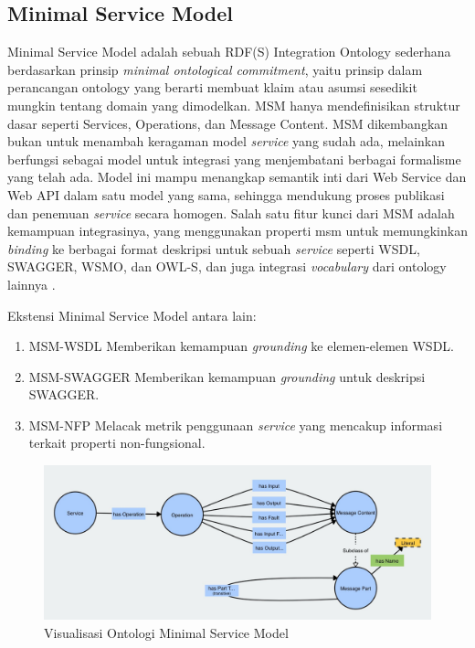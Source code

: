 \subsection{Minimal Service Model}
\label{subsec:minimal-service-model}

Minimal Service Model adalah sebuah RDF(S) Integration Ontology sederhana berdasarkan prinsip \textit{minimal ontological commitment}, yaitu prinsip dalam perancangan ontology yang berarti membuat klaim atau asumsi sesedikit mungkin tentang domain yang dimodelkan. MSM hanya mendefinisikan struktur dasar seperti Services, Operations, dan Message Content. MSM dikembangkan bukan untuk menambah keragaman model \textit{service} yang sudah ada, melainkan berfungsi sebagai model untuk integrasi yang menjembatani berbagai formalisme yang telah ada. Model ini mampu menangkap semantik inti dari Web Service dan Web API dalam satu model yang sama, sehingga mendukung proses publikasi dan penemuan \textit{service} secara homogen. Salah satu fitur kunci dari MSM adalah kemampuan integrasinya, yang menggunakan properti msm untuk memungkinkan \textit{binding} ke berbagai format deskripsi untuk sebuah \textit{service} seperti WSDL, SWAGGER, WSMO, dan OWL-S, dan juga integrasi \textit{vocabulary} dari ontology lainnya \parencite{iserve2015datamodel}.

Ekstensi Minimal Service Model antara lain:
\begin{enumerate}
  \item MSM-WSDL \break Memberikan kemampuan \textit{grounding} ke elemen-elemen WSDL.
  \item MSM-SWAGGER \break Memberikan kemampuan \textit{grounding} untuk deskripsi SWAGGER.
  \item MSM-NFP \break Melacak metrik penggunaan \textit{service} yang mencakup informasi terkait properti non-fungsional.
\end{enumerate}

\begin{figure}[ht]
  \centering
  \includegraphics[width=1\textwidth]{resources/chapter-2/msm-visualization.jpg}
  \caption{Visualisasi Ontologi Minimal Service Model \parencite{third2017linked}}
  \label{image:msm-visualization}
\end{figure}